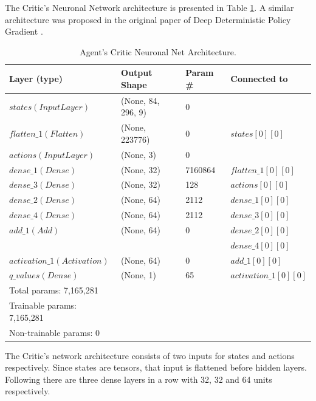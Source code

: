 \documentclass[peerreview,onecolumn]{IEEEtran}
\begin{document}
	 The Critic's Neuronal Network architecture is presented in Table \ref{tab:critic_arch}. A similar architecture was proposed in the original paper of Deep Deterministic Policy Gradient \cite{ddpg_2015}. 
	 
	 
	 
	  \begin{table}[h] 
	\centering
	\begin{tabular}{l l l l} 
		\toprule 				
		Layer (type)          &          Output Shape   &      Param \#   &  Connected to  \\
		\midrule           
		$states (InputLayer) $   &         (None, 84, 296, 9)  & 0 &    \\                          
		$flatten\_1 (Flatten) $   &         (None, 223776) &      0 &          $states[0][0]   $    \\
		$actions (InputLayer)$  &  (None, 3)    &        0      &             \\
		$dense\_1 (Dense)  $ &  (None, 32)  & 7160864  &   $flatten\_1[0][0] $ \\
        $dense\_3 (Dense)  $ & (None, 32) & 128 &  $actions[0][0]$ \\
		$dense\_2 (Dense) $  & (None, 64) & 2112  &  $dense\_1[0][0] $ \\ 
        $dense\_4 (Dense) $ & (None, 64) & 2112 &  $dense\_3[0][0]$ \\
		$add\_1 (Add) $ & (None, 64) &  0  & $dense\_2[0][0] $ \\                   
                                                                &&& $dense\_4[0][0] $ \\
		$activation\_1 (Activation) $ & (None, 64) & 0 & $add\_1[0][0]$ \\
		$q\_values (Dense) $ & (None, 1)& 65 & $activation\_1[0][0] $ \\
		\midrule
		\midrule
Total params: 7,165,281 & & &\\
Trainable params: 7,165,281 & & & \\
Non-trainable params: 0 & & & \\

		\midrule 
		\bottomrule 
	\end{tabular}
	\smallskip 
	\caption{Agent's Critic Neuronal Net Architecture.} 
	\label{tab:critic_arch} 
\end{table}
	 
	 The Critic's network architecture consists of two inputs for states and actions respectively. Since states are tensors, that input is flattened before hidden layers. Following there are three dense layers in a row with 32, 32 and 64 units respectively.
	 
\end{document}
